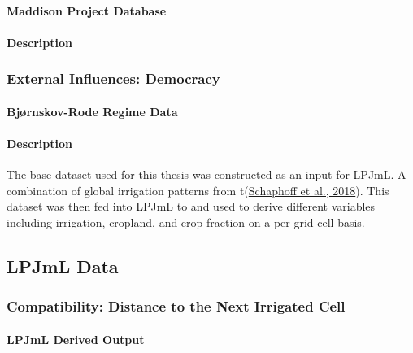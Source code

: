\documentclass[12pt,twoside]{reedthesis}
\begin{document}
\hypertarget{maddison}{%
\paragraph{Maddison Project Database}\label{maddison}}

\hypertarget{description}{%
\paragraph{Description}\label{description}}

\hypertarget{democracy}{%
\subsubsection{External Influences: Democracy}\label{democracy}}

\hypertarget{BRdemo}{%
\paragraph{Bjørnskov-Rode Regime Data}\label{BRdemo}}

\hypertarget{description-1}{%
\paragraph{Description}\label{description-1}}

The base dataset used for this thesis was constructed as an input for LPJmL. A combination of global irrigation patterns from t(\protect\hyperlink{ref-schaphoffLPJmL4DynamicGlobal2018}{Schaphoff et al., 2018}). This dataset was then fed into LPJmL to and used to derive different variables including irrigation, cropland, and crop fraction on a per grid cell basis.

\hypertarget{lpjml-data}{%
\subsection{LPJmL Data}\label{lpjml-data}}

\hypertarget{dist}{%
\subsubsection{Compatibility: Distance to the Next Irrigated Cell}\label{dist}}

\hypertarget{lpjml-derived-output}{%
\paragraph{LPJmL Derived Output}\label{lpjml-derived-output}}
\end{document}

